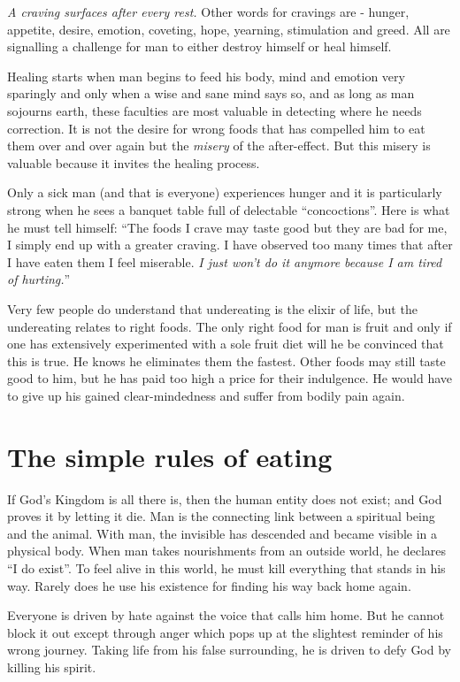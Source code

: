 \documentclass[12pt,letterpaper]{article}
\begin{document}
\emph{A craving surfaces after every rest.} Other words for cravings
are - hunger, appetite, desire, emotion, coveting, hope, yearning,
stimulation and greed. All are signalling a challenge for man to
either destroy himself or heal himself.

Healing starts when man begins to feed his body, mind and emotion very
sparingly and only when a wise and sane mind says so, and as long as
man sojourns earth, these faculties are most valuable in detecting
where he needs correction. It is not the desire for wrong foods that
has compelled him to eat them over and over again but the
\emph{misery} of the after-effect. But this misery is valuable because
it invites the healing process.

Only a sick man (and that is everyone) experiences hunger and it is
particularly strong when he sees a banquet table full of delectable
``concoctions''. Here is what he must tell himself: ``The foods I
crave may taste good but they are bad for me, I simply end up with a
greater craving. I have observed too many times that after I have
eaten them I feel miserable. \emph{I just won't do it anymore because
I am tired of hurting.}''

Very few people do understand that undereating is the elixir of life,
but the undereating relates to right foods. The only right food for
man is fruit and only if one has extensively experimented with a sole
fruit diet will he be convinced that this is true. He knows he
eliminates them the fastest. Other foods may still taste good to him,
but he has paid too high a price for their indulgence. He would have
to give up his gained clear-mindedness and suffer from bodily pain
again.

\section{The simple rules of eating}

If God's Kingdom is all there is, then the human entity does not
exist; and God proves it by letting it die. Man is the connecting link
between a spiritual being and the animal. With man, the invisible has
descended and became visible in a physical body. When man takes
nourishments from an outside world, he declares ``I do exist''. To
feel alive in this world, he must kill everything that stands in his
way. Rarely does he use his existence for finding his way back home
again.

Everyone is driven by hate against the voice that calls him home. But
he cannot block it out except through anger which pops up at the
slightest reminder of his wrong journey. Taking life from his false
surrounding, he is driven to defy God by killing his spirit.
\end{document}
